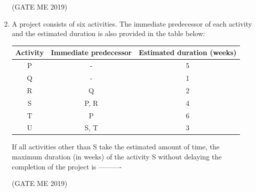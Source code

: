 \documentclass[journal]{IEEEtran}
\begin{document}
\begin{enumerate}
\hfill (GATE ME 2019)

\item A project consists of six activities. The immediate predecessor of each activity and the estimated duration is also provided in the table below:

\begin{tabular}{|c|c|c|}
\hline
Activity & Immediate predecessor & Estimated duration (weeks) \\
\hline
P & - & 5 \\
\hline
Q & - & 1 \\
\hline
R & Q & 2 \\
\hline
S & P, R & 4 \\
\hline
T & P & 6 \\
\hline
U & S, T & 3 \\
\hline
\end{tabular}

If all activities other than S take the estimated amount of time, the maximum duration (in weeks) of the activity S without delaying the completion of the project is ----------

\hfill (GATE ME 2019)


\end{enumerate}
\end{document}

